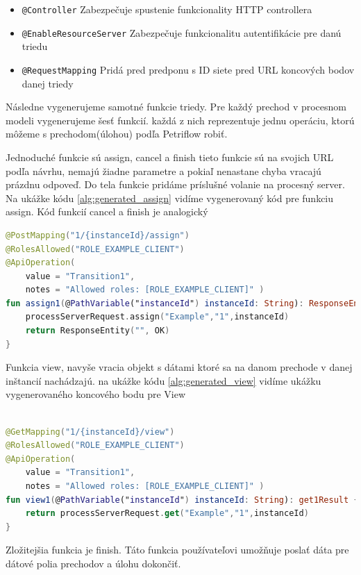 \begin{itemize}
\item \texttt{@Controller} Zabezpečuje spustenie funkcionality HTTP controllera
\item \texttt{@EnableResourceServer} Zabezpečuje funkcionalitu  autentifikácie pre danú triedu
\item \texttt{@RequestMapping} Pridá pred predponu s ID siete pred URL koncových bodov danej triedy
\end{itemize}

Následne vygenerujeme samotné funkcie triedy. Pre každý prechod v procesnom modeli vygenerujeme šesť funkcií. každá z nich reprezentuje jednu operáciu, ktorú môžeme s prechodom(úlohou) podľa Petriflow robiť.

Jednoduché funkcie sú assign, cancel a finish tieto funkcie sú na svojich URL podľa návrhu, nemajú žiadne parametre a pokiaľ nenastane chyba vracajú prázdnu odpoveď. Do tela funkcie pridáme príslušné volanie na procesný server. Na ukážke kódu \ref{alg:generated_assign} vidíme vygenerovaný kód pre funkciu assign. Kód funkcií cancel a finish je analogický

\begin{lstlisting}[float, caption={Príklad vygenerovanej funkcie},label={alg:generated_assign},language=Kotlin]
@PostMapping("1/{instanceId}/assign")
@RolesAllowed("ROLE_EXAMPLE_CLIENT")
@ApiOperation(
	value = "Transition1",
	notes = "Allowed roles: [ROLE_EXAMPLE_CLIENT]" )
fun assign1(@PathVariable("instanceId") instanceId: String): ResponseEntity<String> {
	processServerRequest.assign("Example","1",instanceId)
	return ResponseEntity("", OK)
}
\end{lstlisting}

Funkcia view, navyše vracia objekt s dátami ktoré sa na danom prechode v danej inštancií nachádzajú. na ukážke kódu \ref{alg:generated_view} vidíme ukážku vygenerovaného koncového bodu pre View

\begin{lstlisting}[float, caption={Príklad vygenerovanej funkcie},label={alg:generated_view},language=Kotlin]

@GetMapping("1/{instanceId}/view")
@RolesAllowed("ROLE_EXAMPLE_CLIENT")
@ApiOperation(
	value = "Transition1",
	notes = "Allowed roles: [ROLE_EXAMPLE_CLIENT]" )
fun view1(@PathVariable("instanceId") instanceId: String): get1Result {
	return processServerRequest.get("Example","1",instanceId)
}
\end{lstlisting}


Zložitejšia funkcia je finish. Táto funkcia používateľovi umožňuje poslať dáta pre dátové polia prechodov a úlohu dokončiť.

